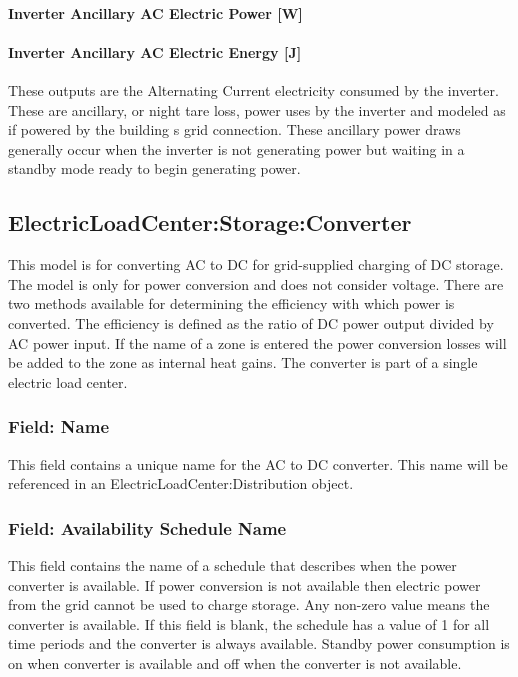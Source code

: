 \paragraph{Inverter Ancillary AC Electric Power {[}W{]}}\label{inverter-ancillary-ac-electric-power-w}

\paragraph{Inverter Ancillary AC Electric Energy {[}J{]}}\label{inverter-ancillary-ac-electric-energy-j}

These outputs are the Alternating Current electricity consumed by the inverter. These are ancillary, or night tare loss, power uses by the inverter and modeled as if powered by the building s grid connection. These ancillary power draws generally occur when the inverter is not generating power but waiting in a standby mode ready to begin generating power.

\subsection{ElectricLoadCenter:Storage:Converter}\label{electricloadcenterstorageconverter}

This model is for converting AC to DC for grid-supplied charging of DC storage. The model is only for power conversion and does not consider voltage. There are two methods available for determining the efficiency with which power is converted. The efficiency is defined as the ratio of DC power output divided by AC power input. If the name of a zone is entered the power conversion losses will be added to the zone as internal heat gains. The converter is part of a single electric load center.

\subsubsection{Field: Name}\label{field-name-5-007}

This field contains a unique name for the AC to DC converter. This name will be referenced in an ElectricLoadCenter:Distribution object.

\subsubsection{Field: Availability Schedule Name}\label{field-availability-schedule-name-4-001}

This field contains the name of a schedule that describes when the power converter is available. If power conversion is not available then electric power from the grid cannot be used to charge storage. Any non-zero value means the converter is available. If this field is blank, the schedule has a value of 1 for all time periods and the converter is always available. Standby power consumption is on when converter is available and off when the converter is not available.

